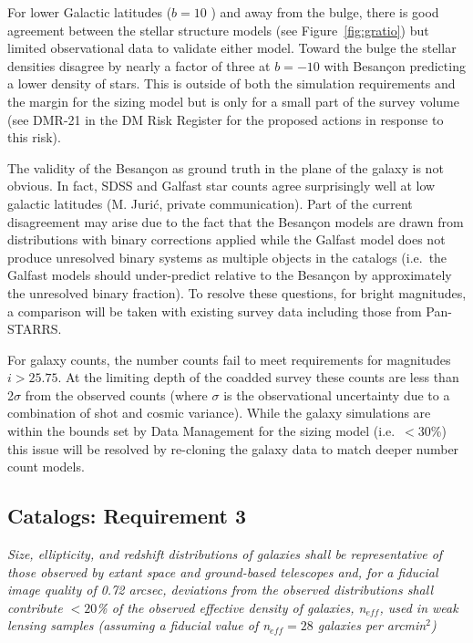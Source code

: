 \documentclass[11pt]{article}
\begin{document}
For lower Galactic latitudes ($b=10$ ) and away from the bulge, there
is good agreement between the stellar structure models (see
Figure~\ref{fig:gratio}) but limited observational data to validate
either model. Toward the bulge the stellar densities disagree by nearly
a factor of three at $b=-10$ with Besan\c{c}on predicting a lower density of
stars. This is outside of both the simulation requirements and the
margin for the sizing model but is only for a small part of the survey
volume (see DMR-21 in the DM Risk Register for the proposed actions in
response to this risk).  

The validity of the Besan\c{c}on as ground truth in the plane of the
galaxy is not obvious.  In fact, SDSS and Galfast star counts agree
surprisingly well at low galactic latitudes (M. Juri\'{c}, private
communication).  Part of the current disagreement may arise due to the
fact that the Besan\c{c}on models are drawn from distributions with
binary corrections applied while the Galfast model does not produce
unresolved binary systems as multiple objects in the catalogs (i.e.\
the Galfast models should under-predict relative to the Besan\c{c}on
by approximately the unresolved binary fraction).  To resolve these
questions, for bright magnitudes, a comparison will be taken with
existing survey data including those from Pan-STARRS.

For galaxy counts, the number counts fail to meet requirements for
magnitudes $i>25.75$. At the limiting depth of the coadded survey
these counts are less than 2$\sigma$ from the observed counts (where
$\sigma$ is the observational uncertainty due to a combination of shot
and cosmic variance). While the galaxy simulations are within the
bounds set by Data Management for the sizing model (i.e.\ $<30$\%)
this issue will be resolved by re-cloning the galaxy data to match
deeper number count models.

\subsection{Catalogs:  Requirement 3}

{\it Size, ellipticity, and redshift distributions of galaxies shall
  be representative of those observed by extant space and ground-based
  telescopes and, for a fiducial image quality of 0.72 arcsec,
  deviations from the observed distributions shall contribute $<20$\%
  of the observed effective density of galaxies, n$_{eff}$, used in
  weak lensing samples (assuming a fiducial value of n$_{eff} =
  28$ galaxies per arcmin$^2$)}\\
\end{document}
